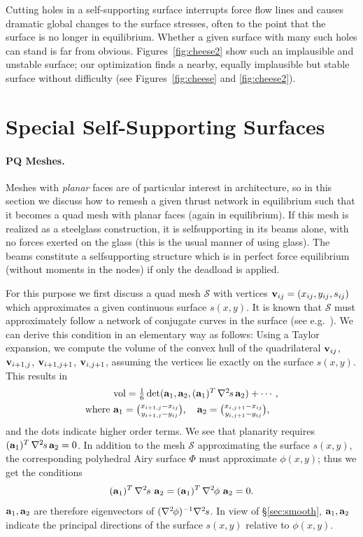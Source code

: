 \documentclass[review]{acmsiggraph}
\def\ess{s}
\def\Hess#1{{\def\testess{#1}\nabla^2\ifx\testess\ess\!s\else #1\fi}}
\def\Hess#1{\text{$\nabla^2\hskip-.2ex #1$}}
\def\SS{{\mathcal S}}
\begin{document}
Cutting holes in a self-supporting surface interrupts force flow lines and 
causes dramatic global changes to the surface stresses, often to the point 
that the surface is no longer in equilibrium. Whether a given surface with 
many such holes can stand is far from obvious. Figures~\ref{fig:cheese2} 
show such an implausible and unstable surface; our optimization finds a 
nearby, equally implausible but stable surface without difficulty (see 
Figures~\ref{fig:cheese} and \ref{fig:cheese2}).



\section{Special Self-Supporting Surfaces} \label{sec:special}

\paragraph{PQ Meshes.}

Meshes with {\em planar} faces are of particular interest in architecture, 
so in this section we discuss how to remesh a given thrust network in 
equilibrium such that it becomes a quad mesh with planar faces (again in 
equilibrium). If this mesh is realized as a steel\dash glass construction,
it is self\dash supporting in its beams alone, with no forces exerted on
the glass (this is the usual manner of using glass). The beams constitute
a self\dash supporting structure which is in perfect force equilibrium
(without moments in the nodes) if only the deadload is applied.


For this purpose we first discuss a quad mesh $\SS$ with vertices
${\mathbf v}_{ij}=(x_{ij},y_{ij},s_{ij})$ which approximates a given continuous
surface $s(x,y)$. It is known that $\SS$ must approximately follow a network
of conjugate curves in the surface (see e.g.\ \cite{Liu2006}). We can derive
this condition in an elementary way as follows: Using a Taylor expansion, we 
compute the volume of the convex hull of the quadrilateral ${\mathbf v}_{ij}$, 
${\mathbf v}_{i+1,j}$, ${\mathbf v}_{i+1,j+1}$, ${\mathbf v}_{i,j+1}$, assuming the vertices lie 
exactly on the surface $s(x,y)$. This results in
	\begin{align*}
	&\textstyle
	\text{vol} =
	{1\over 6}\det(\aw_1,\aw_2,(\aw_1)^T\,\Hess s\,\aw_2) + \cdots,
	\\
	\text{where}\
	& \textstyle
	\aw_1={x_{i+1,j}-x_{ij}\choose y_{i+1,j}-y_{ij}},\quad
	\aw_2={x_{i,j+1}-x_{ij}\choose y_{i,j+1}-y_{ij}},
	\end{align*}
 and the dots indicate higher order terms. We see that planarity requires 
$(\aw_1)^T\,\Hess s\,\aw_2=0$. In addition to the mesh $\SS$ approximating 
the surface $s(x,y)$, the corresponding polyhedral Airy surface $\Phi$ 
must approximate $\phi(x,y)$; thus we get the conditions
	\begin{align*}
	(\aw_1)^T\,\Hess s\,\,\aw_2=
	(\aw_1)^T\,\Hess \phi\,\,\aw_2= 0.
	\end{align*}
 ${\mathbf a}_1,{\mathbf a}_2$ are therefore eigenvectors of $(\Hess\phi)^{-1}\Hess s$. In 
view of \S\ref{sec:smooth}, ${\mathbf a}_1,{\mathbf a}_2$ indicate the principal 
directions of the surface $s(x,y)$ relative to $\phi(x,y)$.
\end{document}
